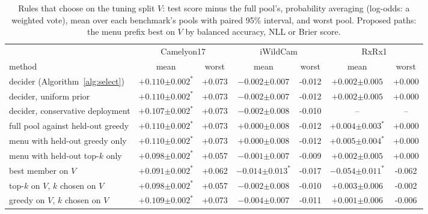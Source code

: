 \begin{table}[t]
\centering
\footnotesize
\caption{Rules that choose on the tuning split $V$: test score minus the full pool's, probability averaging (log-odds: a weighted vote), mean over each benchmark's pools with paired 95\% interval, and worst pool. Proposed paths: the menu prefix best on $V$ by balanced accuracy, NLL or Brier score.}
\label{tab:baselines}
\setlength{\tabcolsep}{3pt}\begin{adjustbox}{max width=\linewidth}
\begin{tabular}{lcccccc}
\toprule
 & \multicolumn{2}{c}{Camelyon17} & \multicolumn{2}{c}{iWildCam} & \multicolumn{2}{c}{RxRx1} \\ \cmidrule(lr){2-3}\cmidrule(lr){4-5}\cmidrule(lr){6-7} method & mean & worst & mean & worst & mean & worst \\
\midrule
decider (Algorithm~\ref{alg:select}) & $+0.110{\scriptstyle\pm0.002}^{\ast}$ & +0.073 & $-0.002{\scriptstyle\pm0.007}$ & -0.012 & $+0.002{\scriptstyle\pm0.005}$ & +0.000 \\
decider, uniform prior & $+0.110{\scriptstyle\pm0.002}^{\ast}$ & +0.073 & $-0.002{\scriptstyle\pm0.007}$ & -0.012 & $+0.002{\scriptstyle\pm0.005}$ & +0.000 \\
decider, conservative deployment & $+0.107{\scriptstyle\pm0.002}^{\ast}$ & +0.073 & $-0.002{\scriptstyle\pm0.008}$ & -0.010 & -- & -- \\
\addlinespace
full pool against held-out greedy & $+0.110{\scriptstyle\pm0.002}^{\ast}$ & +0.073 & $+0.000{\scriptstyle\pm0.008}$ & -0.012 & $+0.004{\scriptstyle\pm0.003}^{\ast}$ & +0.000 \\
menu with held-out greedy only & $+0.110{\scriptstyle\pm0.002}^{\ast}$ & +0.073 & $+0.000{\scriptstyle\pm0.008}$ & -0.012 & $+0.005{\scriptstyle\pm0.004}^{\ast}$ & +0.000 \\
menu with held-out top-$k$ only & $+0.098{\scriptstyle\pm0.002}^{\ast}$ & +0.057 & $-0.001{\scriptstyle\pm0.007}$ & -0.009 & $+0.002{\scriptstyle\pm0.005}$ & +0.000 \\
\addlinespace
best member on $V$ & $+0.091{\scriptstyle\pm0.002}^{\ast}$ & +0.062 & $-0.014{\scriptstyle\pm0.013}^{\ast}$ & -0.017 & $-0.054{\scriptstyle\pm0.011}^{\ast}$ & -0.062 \\
top-$k$ on $V$, $k$ chosen on $V$ & $+0.098{\scriptstyle\pm0.002}^{\ast}$ & +0.057 & $-0.002{\scriptstyle\pm0.008}$ & -0.010 & $+0.003{\scriptstyle\pm0.006}$ & -0.002 \\
greedy on $V$, $k$ chosen on $V$ & $+0.109{\scriptstyle\pm0.002}^{\ast}$ & +0.073 & $-0.004{\scriptstyle\pm0.007}$ & -0.011 & $+0.001{\scriptstyle\pm0.006}$ & -0.006 \\

\end{tabular}
\end{adjustbox}
\end{table}
